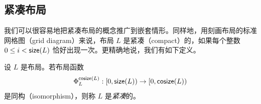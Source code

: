 
\subsection{紧凑布局}
我们可以很容易地把紧凑布局的概念推广到嵌套情形。同样地，用刻画布局的标准网格图（grid diagram）来说，布局 $L$ 是紧凑（compact）的，如果每个整数 $0 \leq i < \mathsf{size}(L)$ 恰好出现一次。更精确地说，我们有如下定义。

\begin{definition}\label{definitionofcompactnestedlayout}
设 $L$ 是布局。若布局函数
\[
\Phi_L^{\mathsf{cosize}(L)} : [0,\mathsf{size}(L)) \to [0,\mathsf{cosize}(L))
\]
是同构（isomorphism），则称 $L$ 是{\it 紧凑}的。
\end{definition}

